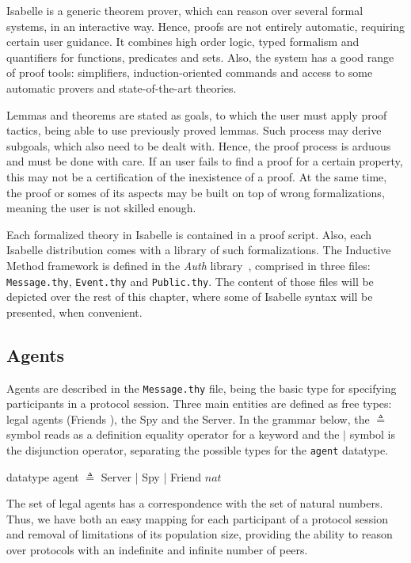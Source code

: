 Isabelle is a generic theorem prover, which can reason over several formal systems, in an interactive way. Hence, proofs are not entirely automatic, requiring certain user guidance. It combines high order logic, typed formalism and quantifiers for functions, predicates and sets. Also, the system has a good range of proof tools: simplifiers, induction-oriented commands and access to some automatic provers and state-of-the-art theories.

Lemmas and theorems are stated as goals, to which the user must apply proof tactics, being able to use previously proved lemmas. Such process may derive subgoals, which also need to be dealt with. Hence, the proof process is arduous and must be done with care. If an user fails to find a proof for a certain property, this may not be a certification of the inexistence of a proof. At the same time, the proof or somes of its aspects may be built on top of wrong formalizations, meaning the user is not skilled enough.

Each formalized theory in Isabelle is contained in a proof script. Also, each Isabelle distribution comes with a library of such formalizations. The Inductive Method framework is defined in the \textit{Auth} library~\cite{isabelle-hol-auth}, comprised in three files: \texttt{Message.thy}, \texttt{Event.thy} and \texttt{Public.thy}. The content of those files will be depicted over the rest of this chapter, where some of Isabelle syntax will be presented, when convenient.



\subsection{Agents}
Agents are described in the \texttt{Message.thy} file, being the basic type for specifying participants in a protocol session. Three main entities are defined as free types: legal agents (Friends ), the Spy and the Server. In the grammar below, the \( \triangleq \) symbol reads as a definition equality operator for a keyword and the \(|\) symbol is the disjunction operator, separating the possible types for the \texttt{agent} datatype.

\begin{center}
  {\ttfamily datatype agent \( \triangleq \) Server | Spy | Friend \(nat\)}
\end{center}

The set of legal agents has a correspondence with the set of natural numbers. Thus, we have both an easy mapping for each participant of a protocol session and removal of limitations of its population size, providing the ability to reason over protocols with an indefinite and infinite number of peers.


